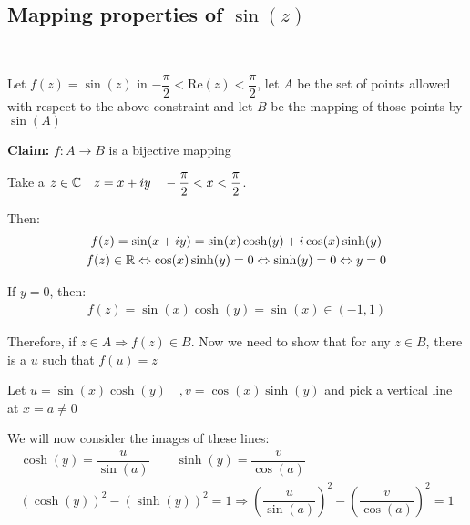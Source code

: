 \subsection{Mapping properties of $\sin(z)$}\hfill\\\par
\noindent Let $f(z) = \sin(z)$ in $-\dfrac{\pi}{2}<\text{Re}(z)<\dfrac{\pi}{2}$, let $A$ be the set of points allowed with respect to the above constraint and let $B$ be the mapping of those points by $\sin(A)$
\par\bigskip
\noindent\textbf{Claim:} $f:A\to B$ is a bijective mapping
\par\bigskip
\begin{prf}[]{}
  Take a $z\in\mathbb{C}\quad z = x+iy\quad -\dfrac{\pi}{2}<x<\dfrac{\pi}{2}$.\par
  \noindent Then:
  \begin{equation*}
    \begin{gathered}
      f(z) = \sin(x+iy)= \sin(x)\cosh(y)+i\cos(x)\sinh(y)\\
      f(z)\in\mathbb{R}\Leftrightarrow \cos(x)\sinh(y) = 0 \Leftrightarrow \sinh(y)=0\Leftrightarrow y=0
    \end{gathered}
  \end{equation*}\par
  \noindent If $y=0$, then:
  \begin{equation*}
    \begin{gathered}
      f(z) = \sin(x)\cosh(y) = \sin(x)\in(-1,1)
    \end{gathered}
  \end{equation*}
  \par\bigskip
  \noindent Therefore, if $z\in A\Rightarrow f(z)\in B$. Now we need to show that for any $z\in B$, there is a $u$ such that $f(u) = z$
  \par\bigskip
  \noindent Let $u = \sin(x)\cosh(y)\quad, v = \cos(x)\sinh(y)$ and pick a vertical line at $x = a\neq0$\par
  \noindent We will now consider the images of these lines:
  \begin{equation*}
    \begin{gathered}
      \cosh(y) = \dfrac{u}{\sin(a)}\qquad\sinh(y) = \dfrac{v}{\cos(a)}\\
      (\cosh(y))^2-(\sinh(y))^2 = 1\Rightarrow \left(\dfrac{u}{\sin(a)}\right)^2-\left(\dfrac{v}{\cos(a)}\right)^2 = 1
    \end{gathered}
  \end{equation*}
  \par\bigskip

\end{prf}
